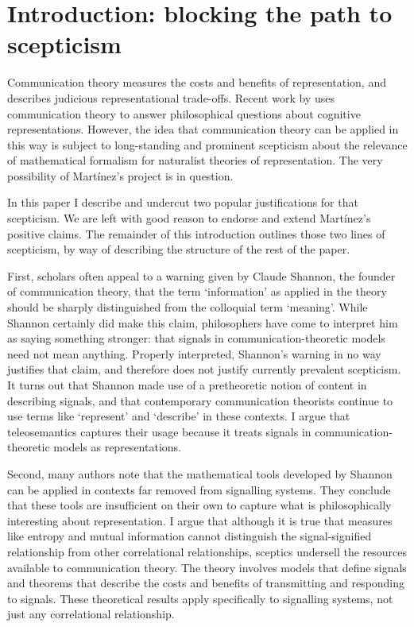 \section{Introduction: blocking the path to scepticism}\label{sec:intro}

Communication theory measures the costs and benefits of representation, and describes judicious representational trade-offs. 
Recent work by \citet{martinez2019representations} uses communication theory to answer philosophical questions about cognitive representations.
However, the idea that communication theory can be applied in this way is subject to long-standing and prominent scepticism about the relevance of mathematical formalism for naturalist theories of representation.
The very possibility of Mart\'{i}nez's project is in question.

In this paper I describe and undercut two popular justifications for that scepticism.
We are left with good reason to endorse and extend Mart\'{i}nez's positive claims.
The remainder of this introduction outlines those two lines of scepticism, by way of describing the structure of the rest of the paper.

First, scholars often appeal to a warning given by Claude Shannon, the founder of communication theory, that the term `information' as applied in the theory should be sharply distinguished from the colloquial term `meaning'.
While Shannon certainly did make this claim, philosophers have come to interpret him as saying something stronger: that signals in communication-theoretic models need not mean anything.
Properly interpreted, Shannon's warning in no way justifies that claim, and therefore does not justify currently prevalent scepticism.
It turns out that Shannon made use of a pretheoretic notion of content in describing signals, and that contemporary communication theorists continue to use terms like `represent' and `describe' in these contexts.
I argue that teleosemantics captures their usage because it treats signals in communication-theoretic models as representations.

Second, many authors note that the mathematical tools developed by Shannon can be applied in contexts far removed from signalling systems.
They conclude that these tools are insufficient on their own to capture what is philosophically interesting about representation.
I argue that although it is true that measures like entropy and mutual information cannot distinguish the signal-signified relationship from other correlational relationships, sceptics undersell the resources available to communication theory.
The theory involves models that define signals and theorems that describe the costs and benefits of transmitting and responding to signals.
These theoretical results apply specifically to signalling systems, not just any correlational relationship.

